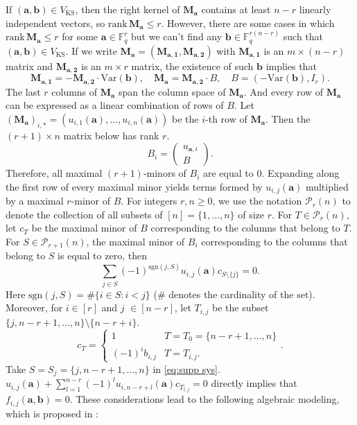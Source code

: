 \documentclass[a4paper, 11pt]{amsart}
\newcommand{\mc}[1]{\mathcal{#1}}
\newcommand{\ssm}[1]{\sum_{#1}}
\newcommand{\td}[1]{\bm{#1}}
\newcommand{\tx}[1]{\text{#1}}
\newcommand{\fq}{\mathbb{F}_q}
\theoremstyle{definition}
\theoremstyle{definition}
\begin{document}
	If $(\td{a},\td{b})\in V_{\tx{KS}}$, then the right kernel of $\td{M_a}$ contains at least $n-r$ linearly independent vectors, so $\tx{rank}\,\td{M_a}\leq r$. However, there are some cases in which $\tx{rank}\,\td{M_a}\leq r$ for some $\td{a}\in\fq^r$ but we can't find any $\td{b}\in\fq^{r(n-r)}$ such that $(\td{a},\td{b})\in V_{\tx{KS}}$. If we write $\td{M_a}=(\td{M_{a,1}},\td{M_{a,2}})$ with $\td{M_{a,1}}$ is an $m\times (n-r)$ matrix and $\td{M_{a,2}}$ is an $m\times r$ matrix, the existence of such $\td{b}$ implies that
	\begin{equation*}
		\td{M_{a,1}}=-\td{M_{a,2}}\cdot \tx{Var}(\td{b}),\quad \td{M_a}=\td{M_{a,2}}\cdot B,\quad B=(-\tx{Var}(\td{b}),I_r).
	\end{equation*}
	The last $r$ columns of $\td{M_a}$ span the column space of $\td{M_a}$. And every row of $\td{M_a}$ can be expressed as a linear combination of rows of $B$. Let $(\td{M_a})_{i,*}=(u_{i,1}(\td{a}),\dots,u_{i,n}(\td{a}))$ be the $i$-th row of $\td{M_a}$. Then the $(r+1)\times n$ matrix below has rank $r$.
	\begin{equation}\label{eq:supp sys}
		B_i=\begin{pmatrix}
			u_{\td{a},i}\\
			B
		\end{pmatrix}.
	\end{equation}
	Therefore, all maximal $(r+1)$-minors of $B_i$ are equal to 0. Expanding along the first row of every maximal minor yields terms formed by $u_{i,j}(\td{a})$ multiplied by a maximal $r$-minor of $B$. For integers $r,n\geq 0$, we use the notation $\mc{P}_r(n)$ to denote the collection of all subsets of $[n]=\{1,\dots,n\}$ of size $r$. For $T\in\mc{P}_r(n)$, let $c_T$ be the maximal minor of $B$ corresponding to the columns that belong to $T$. For $S\in\mc{P}_{r+1}(n)$, the maximal minor of $B_i$ corresponding to the columns that belong to $S$ is equal to zero, then
	\begin{equation*}
		\ssm{j\in S}(-1)^{\tx{sgn}(j,S)}u_{i,j}(\td{a})c_{S\setminus\{j\}}=0.
	\end{equation*}
	Here $\tx{sgn}(j,S)=\#\{i\in S:i<j\}$ ($\#$ denotes the cardinality of the set). Moreover, for $i\in[r]$ and $j$ $\in[n-r]$, let $T_{i,j}$ be the subset $\{j,n-r+1,\dots,n\}\setminus\{n-r+i\}$.
	\begin{equation*}
		c_T=\begin{cases}
			1&T=T_0=\{n-r+1,\dots,n\}\\
			(-1)^ib_{i,j}&T=T_{i,j}.
		\end{cases}.
	\end{equation*}
	Take $S=S_j=\{j,n-r+1,\dots,n\}$ in \eqref{eq:supp sys}. $u_{i,j}(\td{a})+\sum^{n-r}_{l=1}(-1)^lu_{i,n-r+l}(\td{a})c_{T_{l,j}}=0$ directly implies that $f_{i,j}(\td{a},\td{b})=0$. These considerations lead to the following algebraic modeling, which is proposed in \cite{GSM}:
	
\end{document}
